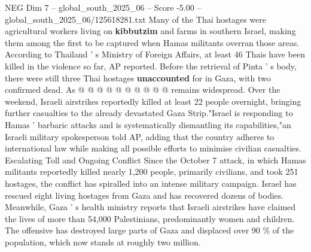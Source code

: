 \begin{textsample}{NEG Dim 7 – global\_south\_2025\_06 – Score -5.00 – global\_south\_2025\_06/125618281.txt}
Many of the Thai hostages were agricultural workers living on \textbf{kibbutzim} and farms in southern Israel, making them among the first to be captured when Hamas militants overran those areas.
According to Thailand ' s Ministry of Foreign Affairs, at least 46 Thais have been killed in the violence so far, AP reported.
Before the retrieval of Pinta ' s body, there were still three Thai hostages \textbf{unaccounted} for in Gaza, with two confirmed dead.
As @ @ @ @ @ @ @ @ @ @ remains widespread.
Over the weekend, Israeli airstrikes reportedly killed at least 22 people overnight, bringing further casualties to the already devastated Gaza Strip."Israel is responding to Hamas ' barbaric attacks and is systematically dismantling its capabilities,"an Israeli military spokesperson told AP, adding that the country adheres to international law while making all possible efforts to minimise civilian casualties.
Escalating Toll and Ongoing Conflict Since the October 7 attack, in which Hamas militants reportedly killed nearly 1,200 people, primarily civilians, and took 251 hostages, the conflict has spiralled into an intense military campaign.
Israel has rescued eight living hostages from Gaza and has recovered dozens of bodies.
Meanwhile, Gaza ' s health ministry reports that Israeli airstrikes have claimed the lives of more than 54,000 Palestinians, predominantly women and children.
The offensive has destroyed large parts of Gaza and displaced over 90 \% of the population, which now stands at roughly two million.

\end{textsample}
